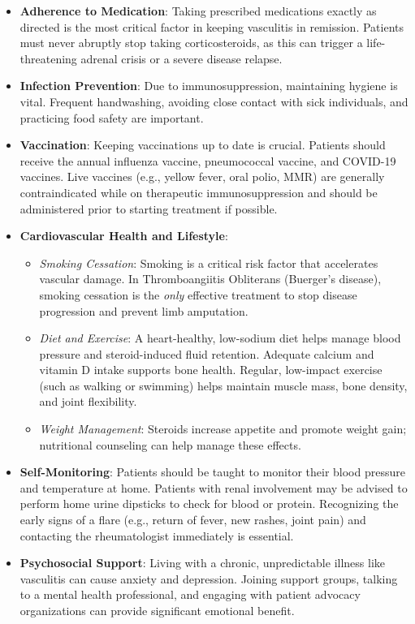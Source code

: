 \begin{itemize}
\item \textbf{Adherence to Medication}: Taking prescribed medications exactly as directed is the most critical factor in keeping vasculitis in remission. Patients must never abruptly stop taking corticosteroids, as this can trigger a life-threatening adrenal crisis or a severe disease relapse.
\item \textbf{Infection Prevention}: Due to immunosuppression, maintaining hygiene is vital. Frequent handwashing, avoiding close contact with sick individuals, and practicing food safety are important.
\item \textbf{Vaccination}: Keeping vaccinations up to date is crucial. Patients should receive the annual influenza vaccine, pneumococcal vaccine, and COVID-19 vaccines. Live vaccines (e.g., yellow fever, oral polio, MMR) are generally contraindicated while on therapeutic immunosuppression and should be administered prior to starting treatment if possible.
\item \textbf{Cardiovascular Health and Lifestyle}:
  \begin{itemize}
  \item \textit{Smoking Cessation}: Smoking is a critical risk factor that accelerates vascular damage. In Thromboangiitis Obliterans (Buerger's disease), smoking cessation is the \textit{only} effective treatment to stop disease progression and prevent limb amputation.
  \item \textit{Diet and Exercise}: A heart-healthy, low-sodium diet helps manage blood pressure and steroid-induced fluid retention. Adequate calcium and vitamin D intake supports bone health. Regular, low-impact exercise (such as walking or swimming) helps maintain muscle mass, bone density, and joint flexibility.
  \item \textit{Weight Management}: Steroids increase appetite and promote weight gain; nutritional counseling can help manage these effects.
  \end{itemize}
\item \textbf{Self-Monitoring}: Patients should be taught to monitor their blood pressure and temperature at home. Patients with renal involvement may be advised to perform home urine dipsticks to check for blood or protein. Recognizing the early signs of a flare (e.g., return of fever, new rashes, joint pain) and contacting the rheumatologist immediately is essential.
\item \textbf{Psychosocial Support}: Living with a chronic, unpredictable illness like vasculitis can cause anxiety and depression. Joining support groups, talking to a mental health professional, and engaging with patient advocacy organizations can provide significant emotional benefit.
\end{itemize}

